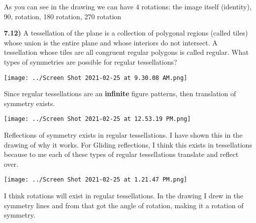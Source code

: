 \documentclass{article}
\begin{document}
\vspace{2mm}

As you can see in the drawing we can have 4 rotations: the image itself (identity), 90, rotation, 180  rotation, 270 rotation 







\newpage
\textbf{7.12)} A tessellation of the plane is a collection of polygonal regions (called tiles) whose union is the entire plane and whose interiors do not intersect. A tessellation whose tiles are all congruent regular polygons is called regular. What types of symmetries are possible for regular tessellations? 

\vspace{2mm}

\texttt{[image: ../Screen Shot 2021-02-25 at 9.30.08 AM.png]} 

\vspace{2mm}

Since regular tessellations are an \textbf{infinite} figure patterns, then translation of symmetry exists. 

\vspace{2mm}

\texttt{[image: ../Screen Shot 2021-02-25 at 12.53.19 PM.png]} 

\vspace{2mm}

Reflections of symmetry exists in regular tessellations. I have shown this in the drawing of why it works. For Gliding reflections, I think this exists in tessellations because to me each of these types of regular tessellations translate and reflect over. 

\vspace{2mm}

\texttt{[image: ../Screen Shot 2021-02-25 at 1.21.47 PM.png]} 

\vspace{2mm}

I think rotations will exist in regular tessellations. In the drawing I drew in the symmetry lines and from that got the angle of rotation, making it a rotation of symmetry.
\end{document}
